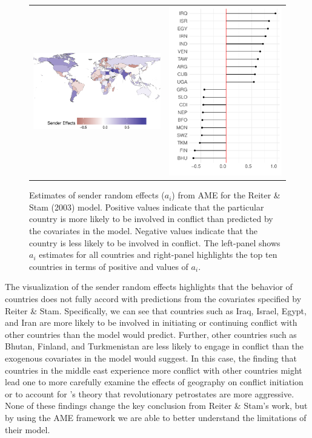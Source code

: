 \begin{figure}[ht]
	\begin{tabular}{cc}
	\includegraphics[width=.7\textwidth]{graphics/reiter_stam_aEff_map.pdf} &
	\includegraphics[width=.3\textwidth]{graphics/reiter_stam_aEff_line.pdf} \\
	\end{tabular}
	\caption{Estimates of sender random effects ($a_{i}$) from AME for the Reiter \& Stam (2003) model. Positive values indicate that the particular country is more likely to be involved in conflict than predicted by the covariates in the model. Negative values indicate that the country is less likely to be involved in conflict. The left-panel shows $a_{i}$ estimates for all countries and right-panel highlights the top ten countries in terms of positive and values of $a_{i}$.}
	\label{fig:reiter_stam_aEff}
\end{figure}
\FloatBarrier

The visualization of the sender random effects highlights that the behavior of countries does not fully accord with predictions from the covariates specified by Reiter \& Stam. Specifically, we can see that countries such as Iraq, Israel, Egypt, and Iran are more likely to be involved in initiating or continuing conflict with other countries than the model would predict. Further, other countries such as Bhutan, Finland, and Turkmenistan are less likely to engage in conflict than the exogenous covariates in the model would suggest. In this case, the finding that countries in the middle east experience more conflict with other countries might lead one to more carefully examine the effects of geography on conflict initiation or to account for \citet{colgan:2010}'s theory that revolutionary petrostates are more aggressive. None of these findings change the key conclusion from Reiter \& Stam's work, but by using the AME framework we are able to better understand the limitations of their model.

